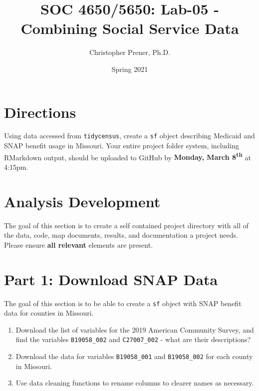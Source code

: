 \documentclass{tufte-handout}
\title{SOC 4650/5650: Lab-05 - Combining Social Service Data}
\author{Christopher Prener, Ph.D.}
\date{Spring 2021}
\begin{document}
\maketitle %

\vspace{5mm}
\section{Directions}
Using data accessed from \texttt{tidycensus}, create a \texttt{sf} object describing Medicaid and SNAP benefit usage in Missouri. Your entire project folder system, including RMarkdown output, should be uploaded to GitHub by \textbf{Monday, March 8\textsuperscript{th}} at 4:15pm.

\section{Analysis Development}
The goal of this section is to create a self contained project directory with all of the data, code, map documents, results, and documentation a project needs. Please ensure \textbf{all relevant} elements are present.

\vspace{5mm}
\section{Part 1: Download SNAP Data}
The goal of this section is to be able to create a \texttt{sf} object with SNAP benefit data for counties in Missouri.
\begin{enumerate}
\item Download the list of variables for the 2019 American Community Survey, and find the variables \texttt{B19058\_002} and \texttt{C27007\_002} - what are their descriptions?
\item Download the data for variables \texttt{B19058\_001} and \texttt{B19058\_002} for each county in Missouri.
\item Use data cleaning functions to rename columns to clearer names as necessary.
\end{enumerate}
\end{document}
